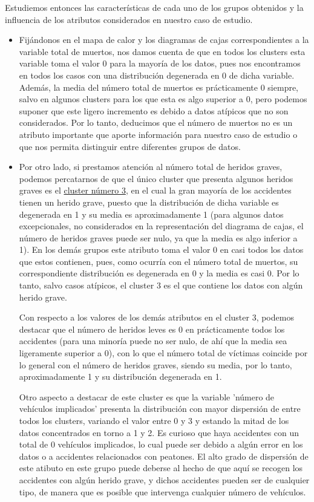 \documentclass[a4paper,11pt]{book}
\begin{document}
Estudiemos entonces las características de cada uno de los grupos obtenidos y la influencia de los atributos considerados en nuestro caso de estudio. 
\begin{itemize}
	\item Fijándonos en el mapa de calor y los diagramas de cajas correspondientes a la variable total de muertos, nos damos cuenta de que en todos los clusters esta variable toma el valor 0 para la mayoría de los datos, pues nos encontramos en todos los casos con una distribución degenerada en 0 de dicha variable. Además, la media del número total de muertos es prácticamente 0 siempre, salvo en algunos clusters para los que esta es algo superior a 0, pero podemos suponer que este ligero incremento es debido a datos atípicos que no son considerados. Por lo tanto, deducimos que el número de muertos no es un atributo importante que aporte información para nuestro caso de estudio o que nos permita distinguir entre diferentes grupos de datos. 
	
	\item  Por otro lado, si prestamos atención al número total de heridos graves, podemos percatarnos de que el único cluster que presenta algunos heridos graves es el \underline{cluster número 3}, en el cual la gran mayoría de los accidentes tienen un herido grave, puesto que la distribución de dicha variable es degenerada en 1 y su media es aproximadamente 1 (para algunos datos excepcionales, no considerados en la representación del diagrama de cajas, el número de heridos graves puede ser nulo, ya que la media es algo inferior a 1). En los demás grupos este atributo toma el valor 0 en casi todos los datos que estos contienen, pues, como ocurría con el número total de muertos, su correspondiente distribución es degenerada en 0 y la media es casi 0. Por lo tanto, salvo casos atípicos, el cluster 3 es el que contiene los datos con algún herido grave.  
	
	Con respecto a los valores de los demás atributos en el cluster 3, podemos destacar que el número de heridos leves es 0 en prácticamente todos los accidentes (para una minoría puede no ser nulo, de ahí que la media sea ligeramente superior a 0), con lo que el número total de víctimas coincide por lo general con el número de heridos graves, siendo su media, por lo tanto, aproximadamente 1 y su distribución degenerada en 1. 
	
	Otro aspecto a destacar de este cluster es que la variable 'número de vehículos implicados' presenta la distribución con mayor dispersión de entre todos los clusters, variando el valor entre 0 y 3 y estando la mitad de los datos concentrados en torno a 1 y 2. Es curioso que haya accidentes con un total de 0 vehículos implicados, lo cual puede ser debido a algún error en los datos o a accidentes relacionados con peatones. El alto grado de dispersión de este atibuto en este grupo puede deberse al hecho de que aquí se recogen los accidentes con algún herido grave, y dichos accidentes pueden ser de cualquier tipo, de manera que es posible que intervenga cualquier número de vehículos.
	

\end{itemize}
\end{document}

